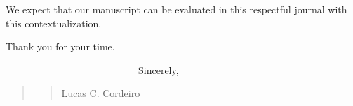 \documentclass[11pt]{article}
\newcommand\vi{\vspace{\baselineskip}}
\begin{document}
We expect that our manuscript can be evaluated in this respectful journal with this contextualization.


\vi
Thank you for your time.
\vi


\indent
~~~~~~~~~~~~~~~~~~~~~~~~~~~Sincerely,\\



\begin{quote}
\begin{quote}
\begin{flushright}



Lucas C. Cordeiro~~~~~~~
\end{flushright}
\end{quote}
\end{quote}


 
 
\end{document}
